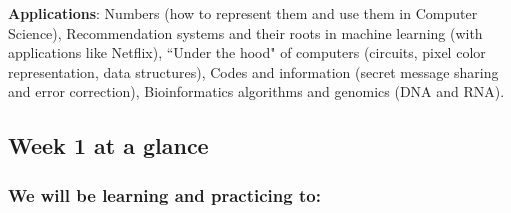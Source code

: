 {\bf Applications}: Numbers (how to represent them and use them in Computer Science), 
Recommendation systems and their roots in machine learning (with applications like Netflix),
``Under the hood" of computers (circuits, pixel color representation, data structures),
Codes and information (secret message sharing and error correction),
Bioinformatics algorithms and genomics (DNA and RNA).


\subsection*{Week 1 at a glance}

\subsubsection*{We will be learning and practicing to:}

